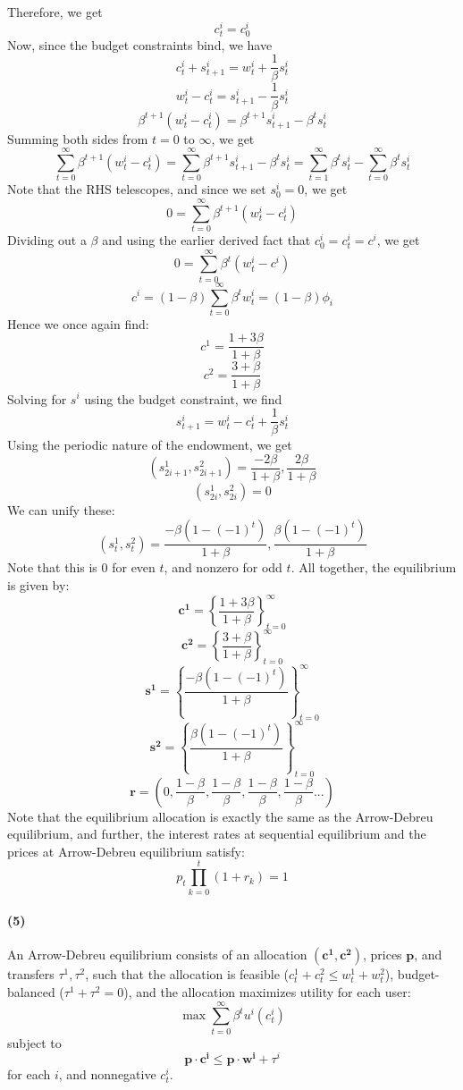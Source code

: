 \documentclass[10pt,letter]{article}
\renewcommand{\vector}[1]{\boldsymbol{#1}}
\newcommand{\problempart}[1]{\paragraph{#1}}
\begin{document}
Therefore, we get
\[ c^i_t = c^i_0 \]
Now, since the budget constraints bind, we have
\[ c^i_t + s^i_{t+1} = w^i_t + \frac{1}{\beta}s^i_t \]
\[ w^i_t - c^i_t = s^i_{t+1} - \frac{1}{\beta}s^i_t \]
\[ \beta^{t+1} (w^i_t - c^i_t) = \beta^{t+1}s^i_{t+1} - \beta^t s^i_{t} \]
Summing both sides from $t = 0$ to $\infty$, we get
\[ \sum_{t=0}^\infty \beta^{t+1} (w^i_t - c^i_t) = \sum_{t=0}^\infty \beta^{t+1}s^i_{t+1} - \beta^t s^i_{t} = \sum_{t=1}^\infty \beta^{t}s^i_{t} -  \sum_{t=0}^\infty \beta^{t}s^i_{t} \]
Note that the RHS telescopes, and since we set $s^i_0 = 0$, we get
\[ 0 = \sum_{t=0}^\infty \beta^{t+1} (w^i_t - c^i_t) \]
Dividing out a $\beta$ and using the earlier derived fact that $c^i_0 = c^i_t = c^i$, we get
\[ 0 = \sum_{t=0}^\infty \beta^{t} (w^i_t - c^i) \]
\[ c^i = (1-\beta) \sum_{t=0}^\infty \beta^t w^i_t = (1-\beta)\phi_i \]
Hence we once again find:
\[ c^1 = \frac{1+3\beta }{1+\beta} \]
\[ c^2 = \frac{3+\beta }{1+\beta} \]
Solving for $s^i$ using the budget constraint, we find
\[ s^i_{t+1} = w^i_t - c^i_t + \frac{1}{\beta} s^i_{t} \]
Using the periodic nature of the endowment, we get
\[ (s^1_{2i+1}, s^2_{2i+1}) = \frac{-2\beta}{1+\beta}, \frac{2\beta}{1+\beta} \]
\[ (s^1_{2i}, s^2_{2i}) = 0 \]
We can unify these:
\[ (s^1_{t}, s^2_{t}) = \frac{-\beta(1 - (-1)^{t})}{1+\beta}, \frac{\beta(1 - (-1)^t)}{1+\beta} \]
Note that this is 0 for even $t$, and nonzero for odd $t$.
All together, the equilibrium is given by:
\[ \vector{c^1} = \left \{ \frac{1+3\beta }{1+\beta}  \right\}_{t=0}^\infty  \]
\[ \vector{c^2} = \left \{ \frac{3+\beta }{1+\beta}  \right\}_{t=0}^\infty  \]
\[ \vector{s^1} = \left \{ \frac{-\beta(1 - (-1)^{t})}{1+\beta}   \right\}_{t=0}^\infty  \]
\[ \vector{s^2} = \left \{ \frac{\beta(1 - (-1)^{t})}{1+\beta}   \right\}_{t=0}^\infty  \]
\[ \vector{r} = \left(0, \frac{1-\beta}{\beta},  \frac{1-\beta}{\beta}, \frac{1-\beta}{\beta}, \frac{1-\beta}{\beta}... \right)  \]
Note that the equilibrium allocation is exactly the same as the Arrow-Debreu equilibrium, and further, the interest rates at sequential equilibrium and the prices at Arrow-Debreu equilibrium satisfy:
\[ p_t \prod_{k=0}^t (1 + r_k) = 1 \]
\problempart{(5)}
An Arrow-Debreu equilibrium consists of an allocation $(\vector{c^1}, \vector{c^2})$, prices $\vector{p}$, and transfers $\tau^1, \tau^2$, such that the allocation is feasible ($c^1_t + c^2_t \le w^1_t + w^2_t$), budget-balanced ($\tau^1 + \tau^2 = 0$), and the allocation maximizes utility for each user:
\[ \max \sum_{t=0}^\infty \beta^t u^i(c^i_t) \]
subject to
\[ \vector{p}\cdot \vector{c^i} \le \vector{p}\cdot \vector{w^i} + \tau^i \]
for each $i$, and nonnegative $c^i_t$.
\end{document}
